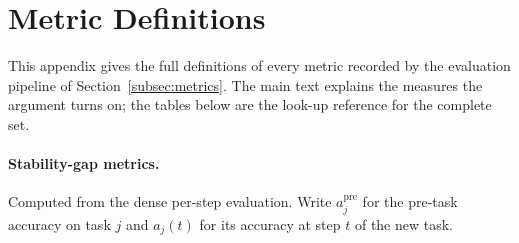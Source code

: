 \section{Metric Definitions}
\label{app:metric_defs}

This appendix gives the full definitions of every metric recorded by the evaluation pipeline of Section~\ref{subsec:metrics}. The main text explains the measures the argument turns on; the tables below are the look-up reference for the complete set.

\paragraph{Stability-gap metrics.} Computed from the dense per-step evaluation. Write $a_j^{\text{pre}}$ for the pre-task accuracy on task $j$ and $a_j(t)$ for its accuracy at step $t$ of the new task.

